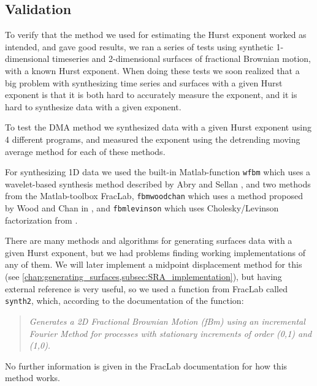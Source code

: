 
\subsection{Validation}
To verify that the method we used for estimating the Hurst exponent worked as intended, and gave good results, we ran a series of tests using synthetic 1-dimensional timeseries and 2-dimensional surfaces of fractional Brownian motion, with a known Hurst exponent. When doing these tests we soon realized that a big problem with synthesizing time series and surfaces with a given Hurst exponent is that it is both hard to accurately measure the exponent, and it is hard to synthesize data with a given exponent. %

To test the DMA method we synthesized data with a given Hurst exponent using 4 different programs, and measured the exponent using the detrending moving average method for each of these methods. 

For synthesizing 1D data we used the built-in Matlab-function \Verb!wfbm! which uses a wavelet-based synthesis method described by Abry and Sellan \cite{abry1996wavelet}, and two methods from the Matlab-toolbox FracLab\cite{fraclab_toolbox}, \Verb!fbmwoodchan! which uses a method proposed by Wood and Chan in \cite{wood1994simulation}, and \Verb!fbmlevinson! which uses Cholesky/Levinson factorization from \cite{levinson1947wiener}. 

There are many methods and algorithms for generating surfaces data with a given Hurst exponent, but we had problems finding working implementations of any of them. We will later implement a midpoint displacement method for this (see \cref{chap:generating_surfaces,subsec:SRA_implementation}), but having external reference is very useful, so we used a function from FracLab called \Verb!synth2!, which, according to the documentation of the function:
\begin{quote}
    \textit{Generates a 2D Fractional Brownian Motion (fBm) using an incremental Fourier Method for processes with stationary increments of order (0,1) and (1,0).}
\end{quote}
No further information is given in the FracLab documentation for how this method works.

